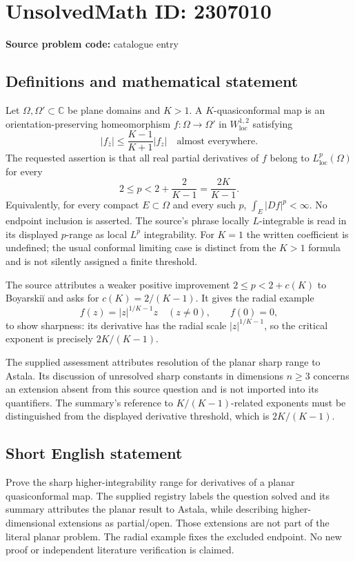 \documentclass[11pt]{article}
\newcommand{\C}{\mathbb{C}}
\begin{document}
\section*{UnsolvedMath ID: 2307010}
\textbf{Source problem code:} catalogue entry
\subsection{Definitions and mathematical statement}
Let $\Omega,\Omega'\subset\C$ be plane domains and $K>1$. A $K$-quasiconformal map is an orientation-preserving homeomorphism $f:\Omega\to\Omega'$ in $W^{1,2}_{\mathrm{loc}}$ satisfying
\[
 |f_{\bar z}|\leq\frac{K-1}{K+1}|f_z|\quad\text{almost everywhere}.
\]
The requested assertion is that all real partial derivatives of $f$ belong to $L^p_{\mathrm{loc}}(\Omega)$ for every
\[
 2\leq p<2+\frac2{K-1}=\frac{2K}{K-1}.
\]
Equivalently, for every compact $E\subset\Omega$ and every such $p$, $\int_E|Df|^p<\infty$. No endpoint inclusion is asserted. The source's phrase locally $L$-integrable is read in its displayed $p$-range as local $L^p$ integrability. For $K=1$ the written coefficient is undefined; the usual conformal limiting case is distinct from the $K>1$ formula and is not silently assigned a finite threshold.

The source attributes a weaker positive improvement $2\leq p<2+c(K)$ to Boyarskiĭ and asks for $c(K)=2/(K-1)$. It gives the radial example
\[
 f(z)=|z|^{1/K-1}z\quad(z\ne0),\qquad f(0)=0,
\]
to show sharpness: its derivative has the radial scale $|z|^{1/K-1}$, so the critical exponent is precisely $2K/(K-1)$.

The supplied assessment attributes resolution of the planar sharp range to Astala. Its discussion of unresolved sharp constants in dimensions $n\geq3$ concerns an extension absent from this source question and is not imported into its quantifiers. The summary's reference to $K/(K-1)$-related exponents must be distinguished from the displayed derivative threshold, which is $2K/(K-1)$.
\subsection{Short English statement}
Prove the sharp higher-integrability range for derivatives of a planar quasiconformal map. The supplied registry labels the question solved and its summary attributes the planar result to Astala, while describing higher-dimensional extensions as partial/open. Those extensions are not part of the literal planar problem. The radial example fixes the excluded endpoint. No new proof or independent literature verification is claimed.
\end{document}
